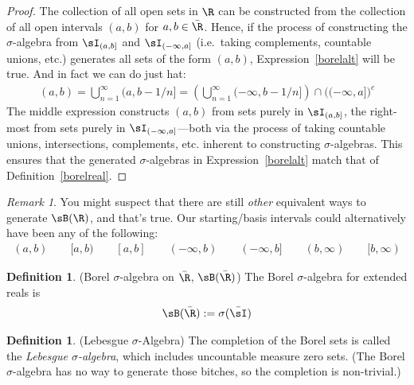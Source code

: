 \documentclass[12pt]{article}
\theoremstyle{plain}
\theoremstyle{definition}
\newtheorem{defn}[thm]{Definition}
\theoremstyle{remark}
\newtheorem*{rmk}{Remark}
\newcommand{\ninf}{_{n=1}^\infty}
\begin{document}
\begin{proof}
The collection of all open sets in $\R$ can be constructed from the
collection of all open intervals $(a,b)$ for $a,b\in\bar{\R}$.
Hence, if the process of constructing the $\sigma$-algebra from
$\sI_{(a,b]}$ and $\sI_{(-\infty,a]}$
(i.e.\ taking complements, countable unions, etc.) generates all sets of
the form $(a,b)$, Expression~\ref{borelalt} will be true.
And in fact we can do just hat:
\begin{align*}
  (a,b) = \bigcup\ninf(a,b-1/n]
  = \left(\bigcup\ninf (-\infty,b-1/n]\right)
  \cap
  \big(
    (-\infty,a]
  \big)^c
\end{align*}
The middle expression constructs $(a,b)$ from sets purely in
$\sI_{(a,b]}$, the right-most from sets purely in
$\sI_{(-\infty,a]}$---both via the process of taking countable unions,
intersections, complements, etc. inherent to constructing
$\sigma$-algebras. This ensures that the generated $\sigma$-algebras in
Expression~\ref{borelalt} match that of Definition~\ref{borelreal}.
\end{proof}

\begin{rmk}
You might suspect that there are still \emph{other} equivalent ways to
generate $\sB(\R)$, and that's true.
Our starting/basis intervals could alternatively have been any of the
following:
\begin{align}
  (a,b)
  \qquad
  [a,b)
  \qquad
  [a,b]
  \qquad
  (-\infty,b)
  \qquad
  (-\infty,b]
  \qquad
  (b,\infty)
  \qquad
  [b,\infty)
  \label{borelsets}
\end{align}
\end{rmk}

\begin{defn}(Borel $\sigma$-algebra on $\bar{\R}$, $\sB(\bar{\R})$)
The Borel $\sigma$-algebra for extended reals is
\begin{align*}
  \sB(\bar{\R}) := \sigma(\bar{\sI})
\end{align*}
\end{defn}

\begin{defn}(Lebesgue $\sigma$-Algebra)
The completion of the Borel sets is called the
\emph{Lebesgue $\sigma$-algebra}, which includes uncountable measure
zero sets. (The Borel $\sigma$-algebra has no way to generate those
bitches, so the completion is non-trivial.)
\end{defn}
\end{document}
